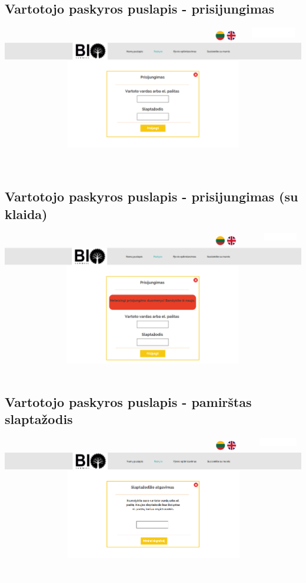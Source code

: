 \documentclass[a4paper,12pt]{article}
\begin{document}
\subsection{Vartotojo paskyros puslapis - prisijungimas}
\hspace{-2cm}
\includegraphics[scale=0.5]{interfeisai/paskyrosPuslapisPrisijungimas}

\subsection{Vartotojo paskyros puslapis - prisijungimas (su klaida)}
\hspace{-2cm}
\includegraphics[scale=0.5]{interfeisai/paskyrosPuslapisPrisijungimasSuKlaida}

\subsection{Vartotojo paskyros puslapis - pamirštas slaptažodis}
\hspace{-2cm}
\includegraphics[scale=0.5]{interfeisai/paskyrosPuslapisPamirstasSlaptazodis}
\end{document}
